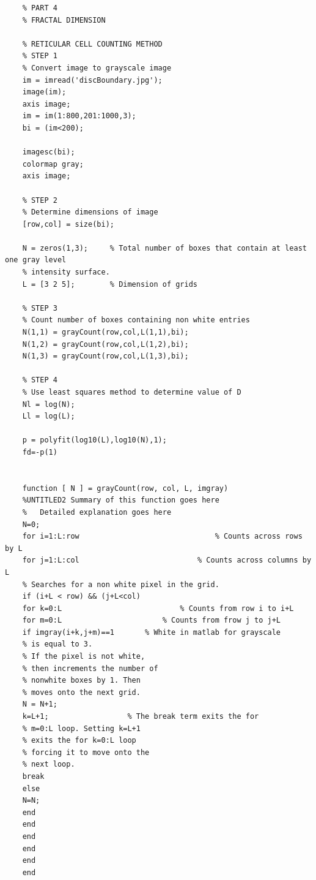 \documentclass[12pt]{article}
\begin{document}
	\begin{verbatim}
	% PART 4
	% FRACTAL DIMENSION
	
	% RETICULAR CELL COUNTING METHOD
	% STEP 1
	% Convert image to grayscale image
	im = imread('discBoundary.jpg');
	image(im);
	axis image;
	im = im(1:800,201:1000,3);
	bi = (im<200);
	
	imagesc(bi);
	colormap gray;
	axis image;
	
	% STEP 2
	% Determine dimensions of image
	[row,col] = size(bi);
	
	N = zeros(1,3);     % Total number of boxes that contain at least one gray level
	% intensity surface.
	L = [3 2 5];        % Dimension of grids
	
	% STEP 3
	% Count number of boxes containing non white entries
	N(1,1) = grayCount(row,col,L(1,1),bi);
	N(1,2) = grayCount(row,col,L(1,2),bi);
	N(1,3) = grayCount(row,col,L(1,3),bi);
	
	% STEP 4
	% Use least squares method to determine value of D
	Nl = log(N);
	Ll = log(L);
	
	p = polyfit(log10(L),log10(N),1);
	fd=-p(1)
	
	
	function [ N ] = grayCount(row, col, L, imgray)
	%UNTITLED2 Summary of this function goes here
	%   Detailed explanation goes here
	N=0;
	for i=1:L:row                               % Counts across rows by L
	for j=1:L:col                           % Counts across columns by L
	% Searches for a non white pixel in the grid.
	if (i+L < row) && (j+L<col)
	for k=0:L                           % Counts from row i to i+L
	for m=0:L                       % Counts from frow j to j+L
	if imgray(i+k,j+m)==1       % White in matlab for grayscale
	% is equal to 3.
	% If the pixel is not white,
	% then increments the number of
	% nonwhite boxes by 1. Then
	% moves onto the next grid.
	N = N+1;
	k=L+1;                  % The break term exits the for
	% m=0:L loop. Setting k=L+1
	% exits the for k=0:L loop
	% forcing it to move onto the
	% next loop.
	break
	else
	N=N;
	end
	end
	end
	end
	end
	end
	
	
	\end{verbatim}	
	
	
	
\end{document}
